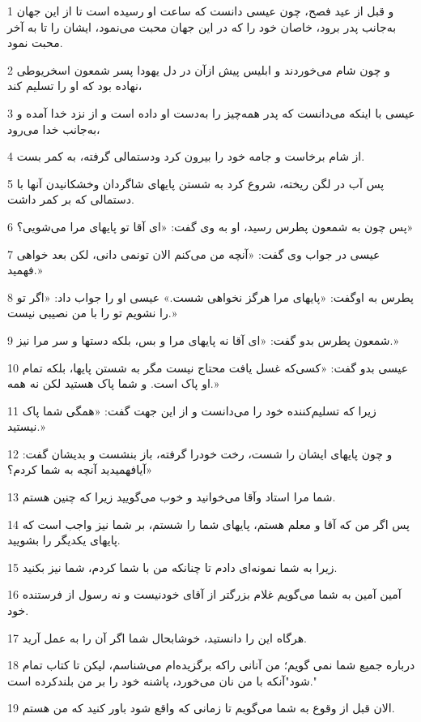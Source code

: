 \par 1 و قبل از عید فصح، چون عیسی دانست که ساعت او رسیده است تا از این جهان به‌جانب پدر برود، خاصان خود را که در این جهان محبت می‌نمود، ایشان را تا به آخر محبت نمود.
\par 2 و چون شام می‌خوردند و ابلیس پیش ازآن در دل یهودا پسر شمعون اسخریوطی نهاده بود که او را تسلیم کند،
\par 3 عیسی با اینکه می‌دانست که پدر همه‌چیز را به‌دست او داده است و از نزد خدا آمده و به‌جانب خدا می‌رود،
\par 4 از شام برخاست و جامه خود را بیرون کرد ودستمالی گرفته، به کمر بست.
\par 5 پس آب در لگن ریخته، شروع کرد به شستن پایهای شاگردان وخشکانیدن آنها با دستمالی که بر کمر داشت.
\par 6 پس چون به شمعون پطرس رسید، او به وی گفت: «ای آقا تو پایهای مرا می‌شویی؟»
\par 7 عیسی در جواب وی گفت: «آنچه من می‌کنم الان تونمی دانی، لکن بعد خواهی فهمید.»
\par 8 پطرس به اوگفت: «پایهای مرا هرگز نخواهی شست.» عیسی او را جواب داد: «اگر تو را نشویم تو را با من نصیبی نیست.»
\par 9 شمعون پطرس بدو گفت: «ای آقا نه پایهای مرا و بس، بلکه دستها و سر مرا نیز.»
\par 10 عیسی بدو گفت: «کسی‌که غسل یافت محتاج نیست مگر به شستن پایها، بلکه تمام او پاک است. و شما پاک هستید لکن نه همه.»
\par 11 زیرا که تسلیم‌کننده خود را می‌دانست و از این جهت گفت: «همگی شما پاک نیستید.»
\par 12 و چون پایهای ایشان را شست، رخت خودرا گرفته، باز بنشست و بدیشان گفت: «آیافهمیدید آنچه به شما کردم؟
\par 13 شما مرا استاد وآقا می‌خوانید و خوب می‌گویید زیرا که چنین هستم.
\par 14 پس اگر من که آقا و معلم هستم، پایهای شما را شستم، بر شما نیز واجب است که پایهای یکدیگر را بشویید.
\par 15 زیرا به شما نمونه‌ای دادم تا چنانکه من با شما کردم، شما نیز بکنید.
\par 16 آمین آمین به شما می‌گویم غلام بزرگتر از آقای خودنیست و نه رسول از فرستنده خود.
\par 17 هرگاه این را دانستید، خوشابحال شما اگر آن را به عمل آرید.
\par 18 درباره جمیع شما نمی گویم؛ من آنانی راکه برگزیده‌ام می‌شناسم، لیکن تا کتاب تمام شود"آنکه با من نان می‌خورد، پاشنه خود را بر من بلندکرده است."
\par 19 الان قبل از وقوع به شما می‌گویم تا زمانی که واقع شود باور کنید که من هستم.
